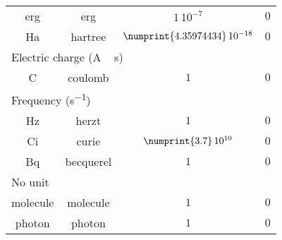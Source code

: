 \begin{longtable}{cccc}
erg   & erg                   & $1\,10^{-7}$                       & $0$ \\
Ha    & hartree               & $\numprint{4.35974434}\,10^{-18}$  & $0$ \\[5pt]
\multicolumn{4}{l}{\textsf{Electric charge} (\unit{A\,s})} \\\cmidrule(rl){1-2}
C & coulomb & $1$ & $0$ \\[5pt]
\multicolumn{4}{l}{\textsf{Frequency} (\unit{s^{-1}})} \\\cmidrule(rl){1-2}
Hz  &  herzt     & $1$                       & $0$ \\
Ci  &  curie     & $\numprint{3.7}\,10^{10}$ & $0$ \\
Bq  &  becquerel & $1$                       & $0$ \\[5pt]
\multicolumn{4}{l}{\textsf{No unit}} \\\cmidrule(rl){1-2}
molecule & molecule & $1$ & $0$ \\
photon   & photon   & $1$ & $0$ \\
\bottomrule
\end{longtable}
